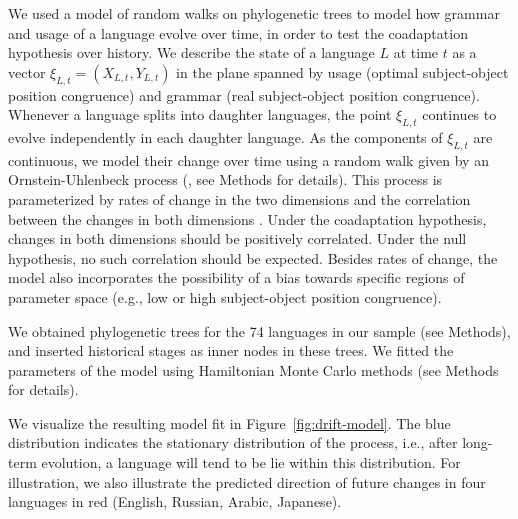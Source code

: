 \documentclass[11pt,a4paper]{article}
\begin{document}
We used a model of random walks on phylogenetic trees \citep{felsenstein1973maximum,pagel1997inferring, pagel2004bayesian} to model how grammar and usage of a language evolve over time, in order to test the coadaptation hypothesis over history.
We describe the state of a language $L$ at time $t$ as a vector $\xi_{L,t} = (X_{L,t}, Y_{L,t})$ in the plane spanned by usage (optimal subject-object position congruence) and grammar (real subject-object position congruence).
Whenever a language splits into daughter languages, the point $\xi_{L,t}$ continues to evolve independently in each daughter language.
As the components of $\xi_{L,t}$ are continuous, we model their change over time using a random walk given by an Ornstein-Uhlenbeck process (\citep{felsenstein1988phylogenies,hansen1997stabilizing, blackwell2003bayesian}, see Methods for details).
This process is parameterized by rates of change in the two dimensions and the correlation between the changes in both dimensions \citep{felsenstein1973maximum,hansen1997stabilizing, freckleton2012fast}.
Under the coadaptation hypothesis, changes in both dimensions should be positively correlated.
Under the null hypothesis, no such correlation should be expected.
Besides rates of change, the model also incorporates the possibility of a bias towards specific regions of parameter space (e.g., low or high subject-object position congruence).

We obtained phylogenetic trees for the 74 languages in our sample (see Methods), and inserted historical stages as inner nodes in these trees.
We fitted the parameters of the model using Hamiltonian Monte Carlo methods (see Methods for details).







We visualize the resulting model fit in Figure~\ref{fig:drift-model}.
The blue distribution indicates the stationary distribution of the process, i.e., after long-term evolution, a language will tend to be lie within this distribution.
For illustration, we also illustrate the predicted direction of future changes in four languages in red (English, Russian, Arabic, Japanese).
\end{document}
